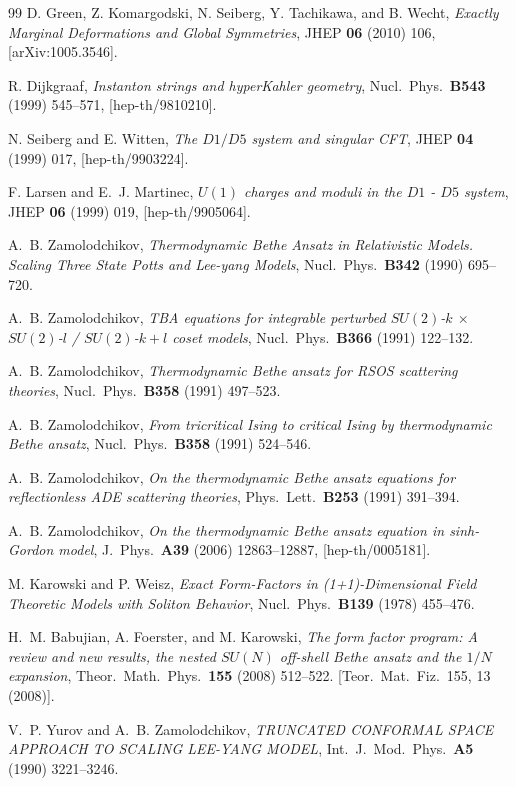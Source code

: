 \begin{thebibliography}{99}
 D. Green, Z. Komargodski, N. Seiberg, Y. Tachikawa, and B. Wecht, \emph{Exactly Marginal Deformations and Global Symmetries}, JHEP \textbf{06} (2010) 106, [arXiv:1005.3546].

 R. Dijkgraaf, \emph{Instanton strings and hyperKahler geometry}, Nucl.\ Phys.\ \textbf{B543} (1999) 545--571, [hep-th/9810210].

 N. Seiberg and E. Witten, \emph{The $D1/D5$ system and singular CFT}, JHEP \textbf{04} (1999) 017, [hep-th/9903224].

 F. Larsen and E.~J. Martinec, \emph{$U(1)$ charges and moduli in the $D1$ - $D5$ system}, JHEP \textbf{06} (1999) 019, [hep-th/9905064].

 A.~B. Zamolodchikov, \emph{Thermodynamic Bethe Ansatz in Relativistic Models. Scaling Three State Potts and Lee-yang Models}, Nucl.\ Phys.\ \textbf{B342} (1990) 695--720.

 A.~B. Zamolodchikov, \emph{TBA equations for integrable perturbed $SU(2)$-$k$ $\times$ $SU(2)$-$l$ / $SU(2)$-$k+l$ coset models}, Nucl.\ Phys.\ \textbf{B366} (1991) 122--132.

 A.~B. Zamolodchikov, \emph{Thermodynamic Bethe ansatz for RSOS scattering theories}, Nucl.\ Phys.\ \textbf{B358} (1991) 497--523.

 A.~B. Zamolodchikov, \emph{From tricritical Ising to critical Ising by thermodynamic Bethe ansatz}, Nucl.\ Phys.\ \textbf{B358} (1991) 524--546.

 A.~B. Zamolodchikov, \emph{On the thermodynamic Bethe ansatz equations for reflectionless ADE scattering theories}, Phys.\ Lett.\ \textbf{B253} (1991) 391--394.

 A.~B. Zamolodchikov, \emph{On the thermodynamic Bethe ansatz equation in sinh-Gordon model}, J.\ Phys.\ \textbf{A39} (2006) 12863--12887, [hep-th/0005181].

 M. Karowski and P. Weisz, \emph{Exact Form-Factors in (1+1)-Dimensional Field Theoretic Models with Soliton Behavior}, Nucl.\ Phys.\ \textbf{B139} (1978) 455--476.

 H.~M. Babujian, A. Foerster, and M. Karowski, \emph{The form factor program: A review and new results, the nested $SU(N)$ off-shell Bethe ansatz and the $1/N$ expansion}, Theor.\ Math.\ Phys.\ \textbf{155} (2008) 512--522. [Teor.\ Mat.\ Fiz.\ 155, 13 (2008)].

 V.~P. Yurov and A.~B. Zamolodchikov, \emph{TRUNCATED CONFORMAL SPACE APPROACH TO SCALING LEE-YANG MODEL}, Int.\ J.\ Mod.\ Phys.\ \textbf{A5} (1990) 3221--3246.


\end{thebibliography}
